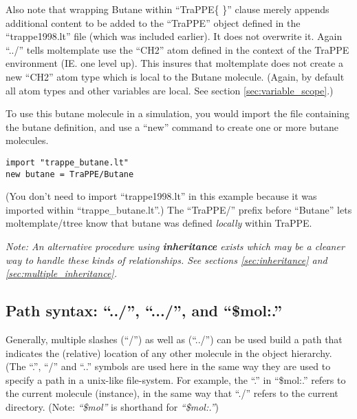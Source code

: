 \documentclass[11pt]{article}
\begin{document}
Also note that wrapping Butane within ``TraPPE\{ \}'' clause merely appends
additional content to be added to the ``TraPPE'' object defined 
in the ``trappe1998.lt'' file (which was included earlier). 
It does not overwrite it. 
Again ``../'' tells moltemplate use the ``CH2'' atom 
defined in the context of the TraPPE environment (IE. one level up).
This insures that moltemplate does not create a new ``CH2'' atom type
which is local to the Butane molecule.  
(Again, by default all atom types and other variables are local.
See section \ref{sec:variable_scope}.)

To use this butane molecule in a simulation, 
you would import the file containing the butane definition,
and use a ``new'' command to create one or more butane molecules.
\begin{verbatim}
import "trappe_butane.lt"
new butane = TraPPE/Butane
\end{verbatim}
(You don't need to import ``trappe1998.lt'' in this example because
it was imported within ``trappe\_butane.lt''.)
The ``TraPPE/'' prefix before ``Butane'' lets moltemplate/ttree
know that butane was defined \textit{locally} within TraPPE.  



\textit{Note: An alternative procedure using \textbf{inheritance}
exists which may be a cleaner way to handle these kinds of relationships.
See sections \ref{sec:inheritance} and \ref{sec:multiple_inheritance}.}

\subsection{Path syntax: ``../'', ``.../'', and ``\$mol:.''}
\label{sec:paths}
Generally, multiple slashes (``/'') as well as (``../'') can be
used build a path that indicates the (relative) location 
of any other molecule in the object hierarchy. 
(The ``.'', ``/'' and ``..'' symbols are used here in the same way 
they are used to specify a path in a unix-like file-system.
For example, the ``.'' in ``\$mol:.'' refers to the 
current molecule (instance), in the same way that 
``./'' refers to the current directory.
(Note: \mbox{\textit{``\$mol''}} is shorthand for \mbox{\textit{``\$mol:.''}})
\end{document}
